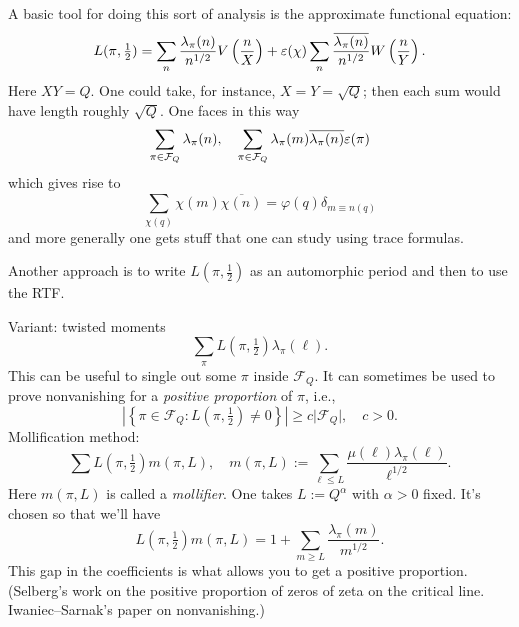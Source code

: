 \documentclass[reqno]{amsart} 
\begin{document}
A basic tool for doing this sort of analysis is the approximate functional equation:
\begin{equation*}
  L(\pi, \tfrac{1}{2} ) = \sum_n \frac{\lambda_\pi(n) }{ n^{1/2} } V \left( \frac{n}{X} \right)
  + \varepsilon(\chi) \sum_n \frac{\overline{\lambda_\pi(n) }}{ n^{1/2} }
  W \left( \frac{n}{Y} \right).
\end{equation*}
Here $X Y = Q$.  One could take, for instance, $X = Y = \sqrt{Q}$; then each sum would have length roughly $\sqrt{Q}$.  One faces in this way
\begin{equation*}
  \sum_{\pi \in \mathcal{F}_Q}
  \lambda_\pi(n),
  \quad
  \sum_{\pi \in \mathcal{F}_Q } \lambda_\pi(m)
  \overline{\lambda_\pi(n)} \varepsilon(\pi)
\end{equation*}
which gives rise to
\begin{equation*}
  \sum_{\chi(q)} \chi(m) \overline{\chi(n)}
  = \varphi(q) \delta_{m \equiv n(q)} 
\end{equation*}
and more generally one gets stuff that one can study using trace formulas.

Another approach is to write $L(\pi, \tfrac{1}{2})$ as an automorphic period and then to use the RTF.

Variant: twisted moments
\begin{equation*}
\sum_\pi L(\pi, \tfrac{1}{2} ) \lambda_\pi(\ell ).
\end{equation*}
This can be useful to single out some $\pi$ inside $\mathcal{F}_Q$.  It can sometimes be used to prove nonvanishing for a \emph{positive proportion} of $\pi$, i.e.,
\begin{equation*}
  \left\lvert \left\{ \pi \in \mathcal{F}_Q  : L(\pi, \tfrac{1}{2} ) \neq 0 \right\} \right\rvert
  \geq c
  \lvert \mathcal{F}_Q \rvert, \quad c > 0.
\end{equation*}
Mollification method:
\begin{equation*}
  \sum L(\pi, \tfrac{1}{2}) m(\pi, L),
  \quad
  m(\pi, L) := \sum_{\ell \leq L}
  \frac{\mu(\ell) \lambda_\pi(\ell)}{\ell^{1/2}}.
\end{equation*}
Here $m(\pi,L)$ is called a \emph{mollifier}.  One takes $L := Q^\alpha$ with $\alpha > 0$ fixed.  It's chosen so that we'll have
\begin{equation*}
  L(\pi, \tfrac{1}{2} ) m(\pi, L) = 1 + \sum_{m \geq L}
  \frac{\lambda_\pi(m)}{m^{1/2}}.
\end{equation*}
This gap in the coefficients is what allows you to get a positive proportion.  (Selberg's work on the positive proportion of zeros of zeta on the critical line.  Iwaniec--Sarnak's paper on nonvanishing.)
\end{document}
